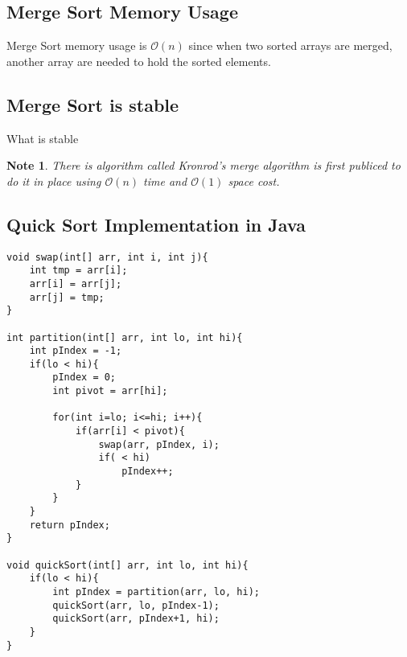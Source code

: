\documentclass{article}
\newtheorem{note}{Note}
\begin{document}
\subsection{Merge Sort Memory Usage} 
Merge Sort memory usage is $\mathcal{O}(n)$ since
when two sorted arrays are merged, another array are needed to hold the sorted elements. 

\subsection{Merge Sort is stable}
What is stable

\begin{note}
There is algorithm called Kronrod's merge algorithm is first publiced to do it in place using $\mathcal{O}(n)$ time and $\mathcal{O}(1)$ space cost.
\end{note}

\pagebreak

\subsection{Quick Sort Implementation in Java} 
\lstset{language=Java,
basicstyle=\ttfamily
}
\begin{lstlisting}[frame=single]
void swap(int[] arr, int i, int j){
    int tmp = arr[i];
    arr[i] = arr[j];
    arr[j] = tmp;
}

int partition(int[] arr, int lo, int hi){
    int pIndex = -1;
    if(lo < hi){
        pIndex = 0;
        int pivot = arr[hi];

        for(int i=lo; i<=hi; i++){
            if(arr[i] < pivot){
                swap(arr, pIndex, i);
                if( < hi)
                    pIndex++;
            }
        }
    }
    return pIndex;
}

void quickSort(int[] arr, int lo, int hi){
    if(lo < hi){
        int pIndex = partition(arr, lo, hi);
        quickSort(arr, lo, pIndex-1);
        quickSort(arr, pIndex+1, hi);
    }
}
\end{lstlisting}

\pagebreak
\end{document}
